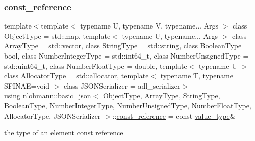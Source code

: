 \subsubsection{\texorpdfstring{const\_reference}{const\_reference}}
{\footnotesize\ttfamily template$<$template$<$ typename U, typename V, typename... Args $>$ class Object\+Type = std\+::map, template$<$ typename U, typename... Args $>$ class Array\+Type = std\+::vector, class String\+Type  = std\+::string, class Boolean\+Type  = bool, class Number\+Integer\+Type  = std\+::int64\+\_\+t, class Number\+Unsigned\+Type  = std\+::uint64\+\_\+t, class Number\+Float\+Type  = double, template$<$ typename U $>$ class Allocator\+Type = std\+::allocator, template$<$ typename T, typename S\+F\+I\+N\+A\+E=void $>$ class J\+S\+O\+N\+Serializer = adl\+\_\+serializer$>$ \\
using \mbox{\hyperlink{classnlohmann_1_1basic__json}{nlohmann\+::basic\+\_\+json}}$<$ Object\+Type, Array\+Type, String\+Type, Boolean\+Type, Number\+Integer\+Type, Number\+Unsigned\+Type, Number\+Float\+Type, Allocator\+Type, J\+S\+O\+N\+Serializer $>$\+::\mbox{\hyperlink{classnlohmann_1_1basic__json_a4057c5425f4faacfe39a8046871786ca}{const\+\_\+reference}} =  const \mbox{\hyperlink{classnlohmann_1_1basic__json_a2b3297873b70c080837e8eedc4fec32f}{value\+\_\+type}}\&}



the type of an element const reference 

\mbox{\label{classnlohmann_1_1basic__json_a72be3c24bfa24f0993d6c11af03e7404}} 

